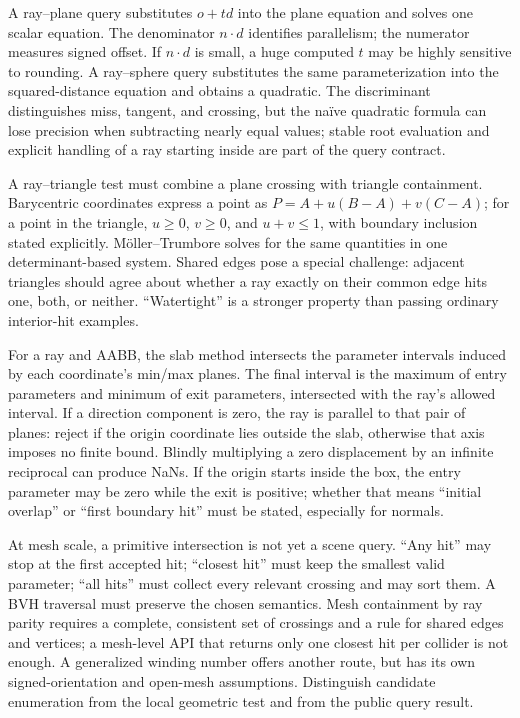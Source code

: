A ray--plane query substitutes \(o+td\) into the plane equation and solves one scalar equation. The denominator \(n\cdot d\) identifies parallelism; the numerator measures signed offset. If \(n\cdot d\) is small, a huge computed \(t\) may be highly sensitive to rounding. A ray--sphere query substitutes the same parameterization into the squared-distance equation and obtains a quadratic. The discriminant distinguishes miss, tangent, and crossing, but the naïve quadratic formula can lose precision when subtracting nearly equal values; stable root evaluation and explicit handling of a ray starting inside are part of the query contract.

A ray--triangle test must combine a plane crossing with triangle containment. Barycentric coordinates express a point as \(P=A+u(B-A)+v(C-A)\); for a point in the triangle, \(u\ge0\), \(v\ge0\), and \(u+v\le1\), with boundary inclusion stated explicitly. Möller--Trumbore solves for the same quantities in one determinant-based system. Shared edges pose a special challenge: adjacent triangles should agree about whether a ray exactly on their common edge hits one, both, or neither. ``Watertight'' is a stronger property than passing ordinary interior-hit examples.

For a ray and AABB, the slab method intersects the parameter intervals induced by each coordinate's min/max planes. The final interval is the maximum of entry parameters and minimum of exit parameters, intersected with the ray's allowed interval. If a direction component is zero, the ray is parallel to that pair of planes: reject if the origin coordinate lies outside the slab, otherwise that axis imposes no finite bound. Blindly multiplying a zero displacement by an infinite reciprocal can produce NaNs. If the origin starts inside the box, the entry parameter may be zero while the exit is positive; whether that means ``initial overlap'' or ``first boundary hit'' must be stated, especially for normals.

At mesh scale, a primitive intersection is not yet a scene query. ``Any hit'' may stop at the first accepted hit; ``closest hit'' must keep the smallest valid parameter; ``all hits'' must collect every relevant crossing and may sort them. A BVH traversal must preserve the chosen semantics. Mesh containment by ray parity requires a complete, consistent set of crossings and a rule for shared edges and vertices; a mesh-level API that returns only one closest hit per collider is not enough. A generalized winding number offers another route, but has its own signed-orientation and open-mesh assumptions. Distinguish candidate enumeration from the local geometric test and from the public query result.


